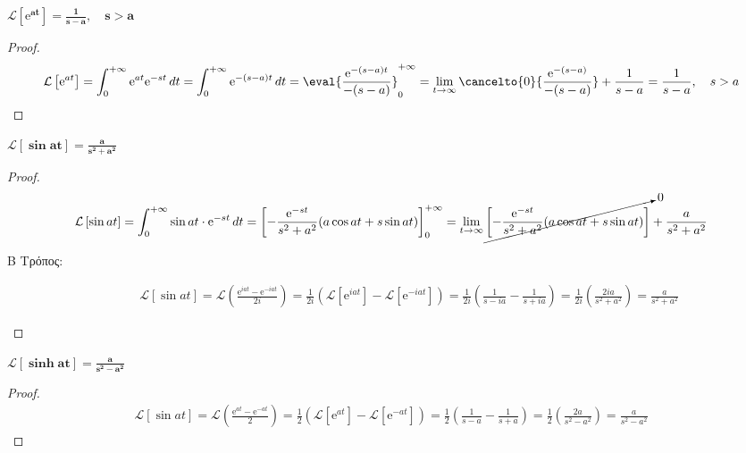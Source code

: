 \begin{example}
  $ \boldsymbol{\mathcal{L}\left[\mathrm{e}^{at}\right] = \frac{1}{s-a}, \quad s > a} $ 
\end{example}
  \begin{proof}
    \[
      \mathcal{L}\left[\mathrm{e}^{at}\right] = \int_{0}^{+\infty} \mathrm{e}^{at} 
      \mathrm{e}^{-st} \,{dt} = \int_{0}^{+\infty} \mathrm{e}^{-(s-a)t} \,{dt} =
      \eval{\frac{\mathrm{e}^{-(s-a)t}}{-(s-a)}} _{0}^{+\infty} = 
      \lim_{t \to \infty} \cancelto{0}{\frac{\mathrm{e}^{-(s-a)}}{-(s-a)}}
      + \frac{1}{s-a} = \frac{1}{s-a}, \quad s > a
    \]
  \end{proof}

\begin{example}
  $ \boldsymbol{\mathcal{L}\left[\sin{at}\right] = \frac{a}{s^{2}+a^{2}}} $
\end{example}
\begin{proof}
  \begin{align*}
    \mathcal{L}\left[\sin{at}\right] &= \int_{0}^{+\infty} \sin{at} \cdot
    \mathrm{e}^{-st} \,{dt} = \left[- \frac{\mathrm{e}^{-st}}{s^{2}+a^{2}} 
    (a \cos{at} + s \sin{at})\right] _{0}^{+\infty} = \lim_{t \to \infty} 
    \cancelto{0}{\left[- \frac{\mathrm{e}^{-st}}{s^{2}+a^{2}} (a \cos{at} + s
    \sin{at})\right]} + \frac{a}{s^{2}+a^{2}} \\
  \end{align*} 
  \begin{description}
    \item [Β Τρόπος:]
      \begin{align*}
        \mathcal{L}\left[\sin{at}\right] = \mathcal{L}\left(\frac{\mathrm{e}^{iat} -
        \mathrm{e}^{-iat}}{2i}\right) = \frac{1}{2i} 
        \left(\mathcal{L}[\mathrm{e}^{iat}] - \mathcal{L}[\mathrm{e}^{-iat}]\right) = 
        \frac{1}{2i} \left(\frac{1}{s-ia} - \frac{1}{s+ia}\right) = 
        \frac{1}{2i} \left(\frac{2ia}{s^{2}+a^{2}}\right) = \frac{a}{s^{2}+a^{2}}
      \end{align*}
  \end{description}
\end{proof}

\begin{example}
  $ \boldsymbol{\mathcal{L}\left[\sinh{at}\right] = \frac{a}{s^{2}-a^{2}}} $
\end{example}
\begin{proof}
  \begin{align*}
    \mathcal{L}\left[\sin{at}\right] = \mathcal{L}\left(\frac{\mathrm{e}^{at} -
    \mathrm{e}^{-at}}{2}\right) = \frac{1}{2} 
    \left(\mathcal{L}[\mathrm{e}^{at}] - \mathcal{L}[\mathrm{e}^{-at}]\right) = 
    \frac{1}{2} \left(\frac{1}{s-a} - \frac{1}{s+a}\right) = 
    \frac{1}{2} \left(\frac{2a}{s^{2}-a^{2}}\right) = \frac{a}{s^{2}-a^{2}}
  \end{align*}
\end{proof}

